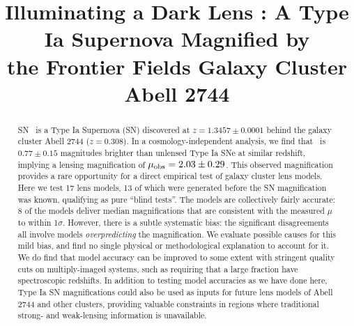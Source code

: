 







\title{Illuminating a Dark Lens : A Type Ia Supernova Magnified by \\ the Frontier Fields Galaxy Cluster Abell 2744}




\begin{abstract}
{
SN \tomas\ is a Type Ia Supernova (SN) discovered at
$z=1.3457\pm0.0001$ behind the galaxy cluster Abell 2744 ($z=0.308$).
In a cosmology-independent analysis, we find that \tomas\ is
$0.77\pm0.15$ magnitudes brighter than unlensed Type Ia SNe at similar
redshift, implying a lensing magnification of $\mu_{\rm
obs}=2.03\pm0.29$.  This observed magnification provides a rare
opportunity for a direct empirical test of galaxy cluster lens models.
Here we test 17 lens models, 13 of which were generated before the SN
magnification was known, qualifying as pure ``blind tests''.  The
models are collectively fairly accurate: 8 of the models deliver
median magnifications that are consistent with the measured $\mu$ to
within 1$\sigma$.  However, there is a subtle systematic bias: the
significant disagreements all involve models {\it overpredicting} the
magnification. We evaluate possible causes for this mild bias, and
find no single physical or methodological explanation to account for
it.  We do find that model accuracy can be improved to some extent
with stringent quality cuts on multiply-imaged systems, such as
requiring that a large fraction have spectroscopic redshifts.  In
addition to testing model accuracies as we have done here, Type Ia SN
magnifications could also be used as inputs for future lens models of
Abell 2744 and other clusters, providing valuable constraints in
regions where traditional strong- and weak-lensing information is
unavailable.}
\end{abstract}


